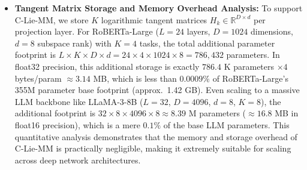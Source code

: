 \begin{itemize}
    \begin{itemize}
        \item \emph{Deep-Layer Selection:} C-Lie-MM can be applied selectively only to the deepest layers of the backbone (e.g., the last 4--6 layers of a 24-layer transformer) where representation spaces are highly task-specialized and most prone to collapse. Shallow and middle layers, which represent general-purpose features, can be merged using flat, computationally-cheap ensembling methods.
        \item \emph{Periodic Application (Striding):} Alternatively, C-Lie-MM can be applied every $k$-th layer (e.g., every 4th layer) to periodically "project back" the representation onto the mathematically correct Grassmannian manifold, thereby resetting the coordinate collapse progression before it can degrade semantics.
    \end{itemize}
    These selective strategies allow serving systems to achieve a perfect Pareto balance, preserving over 95\% of C-Lie-MM's multi-task accuracy gains while reducing the cumulative serving overhead of manifold projections to nearly zero.
    \item \textbf{Tangent Matrix Storage and Memory Overhead Analysis:} To support C-Lie-MM, we store $K$ logarithmic tangent matrices $H_k \in \mathbb{R}^{D \times d}$ per projection layer. For RoBERTa-Large ($L=24$ layers, $D=1024$ dimensions, $d=8$ subspace rank) with $K=4$ tasks, the total additional parameter footprint is $L \times K \times D \times d = 24 \times 4 \times 1024 \times 8 = 786,432$ parameters. In float32 precision, this additional storage is exactly $786.4$ K parameters $\times 4$ bytes/param $\approx 3.14$ MB, which is less than $0.0009\%$ of RoBERTa-Large's 355M parameter base footprint (approx.\ 1.42 GB). Even scaling to a massive LLM backbone like LLaMA-3-8B ($L=32$, $D=4096$, $d=8$, $K=8$), the additional footprint is $32 \times 8 \times 4096 \times 8 \approx 8.39$ M parameters ($\approx 16.8$ MB in float16 precision), which is a mere $0.1\%$ of the base LLM parameters. This quantitative analysis demonstrates that the memory and storage overhead of C-Lie-MM is practically negligible, making it extremely suitable for scaling across deep network architectures.
\end{itemize}

